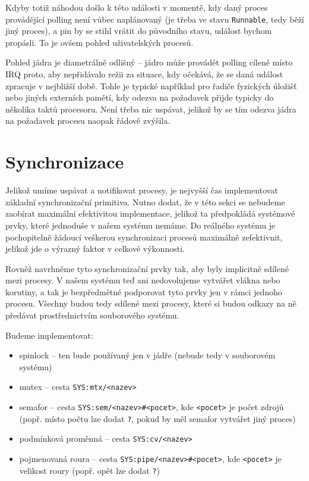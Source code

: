 \documentclass{article}
\begin{document}
Kdyby totiž náhodou došlo k této události v momentě, kdy daný proces provádějící polling není vůbec naplánovaný (je třeba ve stavu \texttt{Runnable}, tedy běží jiný proces), a pin by se stihl vrátit do původního stavu, událost bychom propásli. To je ovšem pohled uživatelských procesů.

Pohled jádra je diametrálně odlišný -- jádro může provádět polling cíleně místo IRQ proto, aby nepřidávalo režii za situace, kdy očekává, že se daná událost zpracuje v nejbližší době. Tohle je typické například pro řadiče fyzických úložišť nebo jiných externích pamětí, kdy odezva na požadavek přijde typicky do několika taktů procesoru. Není třeba nic uspávat, jelikož by se tím odezva jádra na požadavek procesu naopak řádově zvýšila.

\section{Synchronizace}

Jelikož umíme uspávat a notifikovat procesy, je nejvyšší čas implementovat základní synchronizační primitiva. Nutno dodat, že v této sekci se nebudeme zaobírat maximální efektivitou implementace, jelikož ta předpokládá systémové prvky, které jednoduše v našem systému nemáme. Do reálného systému je pochopitelně žádoucí veškerou synchronizaci procesů maximálně zefektivnit, jelikož jde o výrazný faktor v celkové výkonnosti.

Rovněž navrhněme tyto synchronizační prvky tak, aby byly implicitně sdílené mezi procesy. V našem systému teď ani nedovolujeme vytvářet vlákna nebo korutiny, a tak je bezpředmětné podporovat tyto prvky jen v rámci jednoho procesu. Všechny budou tedy sdílené mezi procesy, které si budou odkazy na ně předávat prostřednictvím souborového systému.

Budeme implementovat:
\begin{itemize}
	\item spinlock -- ten bude používaný jen v jádře (nebude tedy v souborovém systému)
	\item mutex -- cesta \texttt{SYS:mtx/<nazev>}
	\item semafor -- cesta \texttt{SYS:sem/<nazev>\#<pocet>}, kde \texttt{<pocet>} je počet zdrojů (popř. místo počtu lze dodat \texttt{?}, pokud by měl semafor vytvářet jiný proces)
	\item podmínková proměnná -- cesta \texttt{SYS:cv/<nazev>}
	\item pojmenovaná roura -- cesta \texttt{SYS:pipe/<nazev>\#<pocet>}, kde \texttt{<pocet>} je velikost roury (popř. opět lze dodat \texttt{?})
\end{itemize}
\end{document}
